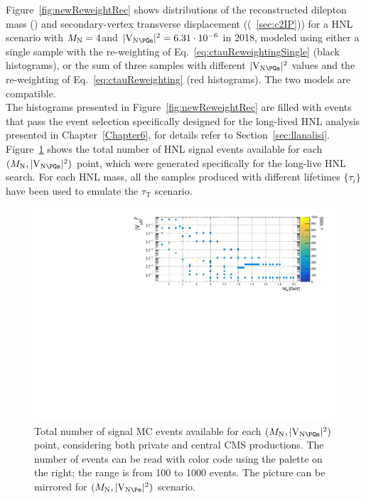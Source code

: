 Figure~\ref{fig:newReweightRec} shows distributions of the
reconstructed dilepton mass (\mtwol) and secondary-vertex transverse
displacement (\Deltwod (~\ref{sec:c2IP})) for a HNL scenario with
$M_{\mathrm{N}}=4$\GeV and $\mixparm = 6.31\cdot 10^{-6}$ in 2018,
modeled using either a single sample with the re-weighting of
Eq.~\ref{eq:ctauReweightingSingle} (black histograms), or the sum of
three samples with different $\mixparm$ values and the re-weighting of
Eq.~\ref{eq:ctauReweighting} (red histograms). The two models are compatible.\\
The histograms
presented in Figure~\ref{fig:newReweightRec} are filled with events
that pass the event selection specifically designed for the
long-lived HNL analysis presented in Chapter~\ref{Chapter6}, for details
refer to Section~\ref{sec:llanalisi}. \\

Figure~\ref{fig:hnlSamples} shows the total number of HNL signal
events available for each $(\mhnl,\mixparm)$ point, which were
generated specifically for the long-live HNL search. For each HNL
mass, all the samples produced with different lifetimes
$\{\tau_i\}$ have been used to emulate the $\tau_{\mathrm T}$ scenario.


\begin{figure}[h!]
  \centering
  \includegraphics[clip,trim=0.7cm 0cm 0cm 0cm ,width=1\textwidth]{Figures/c4/mu.pdf}
  \caption{Total number of signal MC events available for each
    $(\mhnl,\mixparm)$ point, considering both private and central CMS
    productions. The number of events can be read with color code
    using the palette on the right; the range is from 100 to 1000 events. The picture can be mirrored for $(\mhnl,\mixpare)$ scenario.}
  \label{fig:hnlSamples}
\end{figure}



